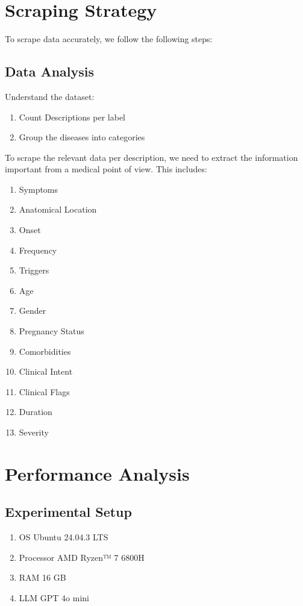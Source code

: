\documentclass[conference, anonymous]{IEEEtran}
\begin{document}
\section{Scraping Strategy}
To scrape data accurately, we follow the following steps:

\subsection{Data Analysis}
Understand the dataset:
\begin{enumerate}
    \item Count Descriptions per label
    \item Group the diseases into categories
\end{enumerate}

To scrape the relevant data per description, we need to extract the information important from a medical point of view. This includes:
\begin{enumerate}
    \item Symptoms
    \item Anatomical Location
    \item Onset
    \item Frequency
    \item Triggers
    \item Age
    \item Gender
    \item Pregnancy Status
    \item Comorbidities
    \item Clinical Intent
    \item Clinical Flags
    \item Duration
    \item Severity

\end{enumerate}

\section{Performance Analysis}
\label{sec: performance-analysis}

\subsection{Experimental Setup}
\begin{enumerate}
    \item OS Ubuntu 24.04.3 LTS
    \item Processor AMD Ryzen™ 7 6800H 
    \item RAM 16 GB
    \item LLM GPT 4o mini
\end{enumerate}
\end{document}
